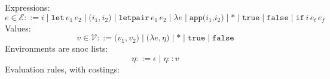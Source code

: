 \documentclass{workingnote}
\begin{document}
\newcommand{\cnstLookup}{c_{\mathit{lookup}}}
\newcommand{\cnstLet}{c_{\mathit{let}}}
\newcommand{\cnstPair}{c_{\mathit{pair}}}
\newcommand{\cnstLetPair}{c_{\mathit{letpair}}}
\newcommand{\cnstLam}{c_{\mathit{lam}}}
\newcommand{\cnstApp}{c_{\mathit{app}}}
\newcommand{\cnstBool}{c_{\mathit{bool}}}
\newcommand{\cnstIf}{c_{\mathit{if}}}
\newcommand{\cnstUnitVal}{c_\mathit{unit}}

\newcommand{\Let}{\texttt{let}}
\newcommand{\LetPair}{\texttt{letpair}}
\newcommand{\Pair}[1]{\texttt{(}#1\texttt{)}}
\newcommand{\Idx}[1]{\texttt{#1}}
\newcommand{\True}{\texttt{true}}
\newcommand{\False}{\texttt{false}}
\newcommand{\If}{\texttt{if}}
\newcommand{\Unit}{\texttt{*}}
\newcommand{\Apply}[2]{\texttt{app(}#1\texttt{,}#2\texttt{)}}

Expressions:
\begin{displaymath}
  e \in \mathcal{E} ::= i \mid \Let\,e_1\,e_2 \mid \Pair{i_1, i_2} \mid \LetPair\,e_1\,e_2 \mid \lambda e \mid \Apply{i_1}{i_2} \mid \Unit \mid \True \mid \False \mid \If\,i\,e_t\,e_f
\end{displaymath}
Values:
\begin{displaymath}
  v \in \mathcal{V} ::= \Pair{v_1, v_2} \mid \Pair{\lambda e, \eta} \mid \Unit \mid \True \mid \False
\end{displaymath}
Environments are snoc lists:
\begin{displaymath}
  \eta ::= \epsilon \mid \eta :: v
\end{displaymath}
Evaluation rules, with costings:
\end{document}
